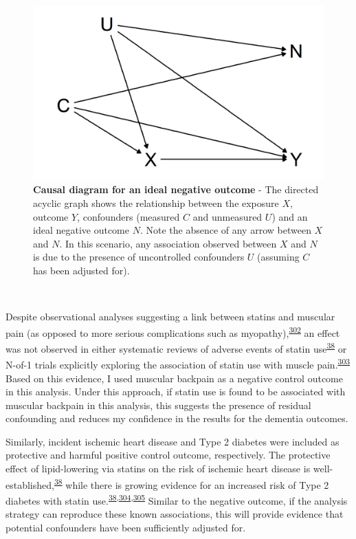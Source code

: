 \documentclass[a4paper, twoside]{templates/ociamthesis}
\begin{document}
~\\




\begin{figure}[H]

{\centering \includegraphics[width=0.8\linewidth]{figures/cprd-analysis/negativeOutcome} 

}

\caption[Causal diagram for ideal negative outcome]{\textbf{Causal diagram for an ideal negative outcome} - The directed acyclic graph shows the relationship between the exposure \(X\), outcome \(Y\), confounders (measured \(C\) and unmeasured \(U\)) and an ideal negative outcome \(N\). Note the absence of any arrow between \(X\) and \(N\). In this scenario, any association observed between \(X\) and \(N\) is due to the presence of uncontrolled confounders \(U\) (assuming \(C\) has been adjusted for).}\label{fig:negativeOutcome}
\end{figure}

~

Despite observational analyses suggesting a link between statins and muscular pain (as opposed to more serious complications such as myopathy),\textsuperscript{\protect\hyperlink{ref-selva-ocallaghan2018}{302}} an effect was not observed in either systematic reviews of adverse events of statin use\textsuperscript{\protect\hyperlink{ref-collins2016}{38}} or N-of-1 trials explicitly exploring the association of statin use with muscle pain.\textsuperscript{\protect\hyperlink{ref-herrett2021}{303}} Based on this evidence, I used muscular backpain as a negative control outcome in this analysis. Under this approach, if statin use is found to be associated with muscular backpain in this analysis, this suggests the presence of residual confounding and reduces my confidence in the results for the dementia outcomes.

Similarly, incident ischemic heart disease and Type 2 diabetes were included as protective and harmful positive control outcome, respectively. The protective effect of lipid-lowering via statins on the risk of ischemic heart disease is well-established,\textsuperscript{\protect\hyperlink{ref-collins2016}{38}} while there is growing evidence for an increased risk of Type 2 diabetes with statin use.\textsuperscript{\protect\hyperlink{ref-collins2016}{38},\protect\hyperlink{ref-macedo2014}{304},\protect\hyperlink{ref-smit2020}{305}} Similar to the negative outcome, if the analysis strategy can reproduce these known associations, this will provide evidence that potential confounders have been sufficiently adjusted for.
\end{document}
